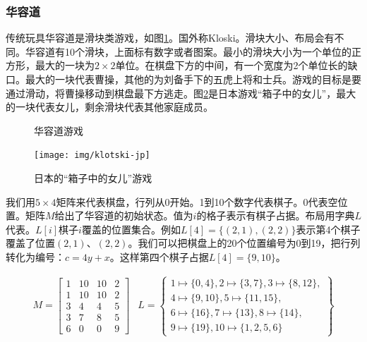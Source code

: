 \documentclass[b5paper]{ctexart}
\begin{document}
\subsubsection{华容道}

传统玩具华容道是滑块类游戏，如图\ref{fig:klotski-cn}。国外称Kloski。滑块大小、布局会有不同。华容道有10个滑块，上面标有数字或者图案。最小的滑块大小为一个单位的正方形，最大的一块为$2 \times 2$单位。在棋盘下方的中间，有一个宽度为2个单位长的缺口。最大的一块代表曹操，其他的为刘备手下的五虎上将和士兵。游戏的目标是要通过滑动，将曹操移动到棋盘最下方逃走。图\ref{fig:klotski-jp}是日本游戏“箱子中的女儿”，最大的一块代表女儿，剩余滑块代表其他家庭成员。

\begin{figure}[htbp]
 \centering
  \hspace{.01\textwidth}
 \caption{华容道游戏}
 \label{fig:klotski-cn}
\end{figure}

\begin{figure}[htbp]
 \centering
 \texttt{[image: img/klotski-jp]}
 \caption{日本的“箱子中的女儿”游戏}
 \label{fig:klotski-jp}
\end{figure}

我们用$5 \times 4$矩阵来代表棋盘，行列从0开始。1到10个数字代表棋子。0代表空位置。矩阵$M$给出了华容道的初始状态。值为$i$的格子表示有棋子占据。布局用字典$L$代表。$L[i]$棋子$i$覆盖的位置集合。例如$L[4] = \{(2, 1), (2, 2)\}$表示第4个棋子覆盖了位置$(2, 1)$、$(2, 2)$。我们可以把棋盘上的20个位置编号为0到19，把行列转化为编号：$c = 4y + x$。这样第四个棋子占据$L[4] = \{9, 10\}$。

\[
\begin{array}{cc}
M = \left [
  \begin{array}{cccc}
  1 & 10 & 10 & 2 \\
  1 & 10 & 10 & 2 \\
  3 & 4 & 4 & 5 \\
  3 & 7 & 8 & 5 \\
  6 & 0 & 0 & 9
  \end{array}
\right ] &
L = \left \{
  \begin{array}{l}
  1 \mapsto \{0, 4\}, 2 \mapsto \{3, 7\}, 3 \mapsto \{8, 12\}, \\
  4 \mapsto \{9, 10\}, 5 \mapsto \{11, 15\}, \\
  6 \mapsto \{16\}, 7 \mapsto \{ 13 \}, 8 \mapsto \{ 14 \}, \\
  9 \mapsto \{ 19 \}, 10 \mapsto \{1, 2, 5, 6\}
  \end{array}
\right \}
\end{array}
\]
\end{document}
